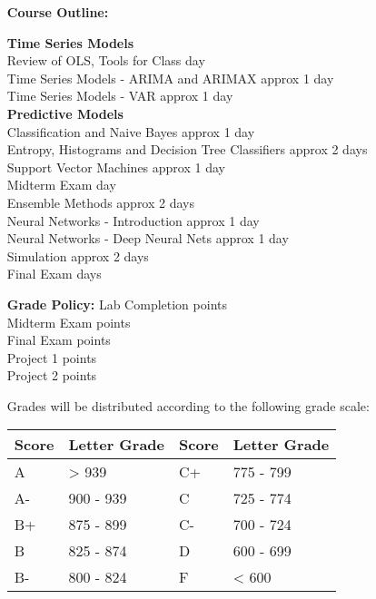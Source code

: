 \documentclass[12pt, margin=.5in]{article}
\begin{document}
\begin{itemize}
\vspace*{.15in}
\item[\textbf{Course Outline:}]

\textbf{Time Series Models}\hfill \\
Review of OLS, Tools for Class  day\\
Time Series Models - ARIMA and ARIMAX \dotfill approx 1 day\\
Time Series Models - VAR \dotfill approx 1 day\\
\textbf{Predictive Models}\hfill \\
Classification and Naive Bayes \dotfill approx 1 day\\
Entropy, Histograms and Decision Tree Classifiers \dotfill approx 2 days\\
Support Vector Machines \dotfill approx 1 day\\
Midterm Exam  day\\
Ensemble Methods \dotfill approx 2 days\\
Neural Networks - Introduction \dotfill approx 1 day\\
Neural Networks - Deep Neural Nets \dotfill approx 1 day\\
Simulation \dotfill approx 2 days\\
Final Exam  days\\



\vspace*{.15in}
\item[\textbf{Grade Policy:}] 
Lab Completion  points\\
Midterm Exam  points \\
Final Exam  points \\
Project 1  points\\
Project 2  points

\vspace*{1em}
Grades will be distributed according to the following grade scale: \\

\begin{tabular}{l|l|l|l}
Score & Letter Grade & Score & Letter Grade\\
\hline
A & > 939 & C+ & 775 - 799 \\
A- & 900 - 939 & C & 725 - 774 \\
B+ & 875 - 899 & C- & 700 - 724 \\
B & 825 - 874 & D & 600 - 699 \\
B- & 800 - 824 & F & < 600 \\
\end{tabular}



\end{itemize}
\end{document}
